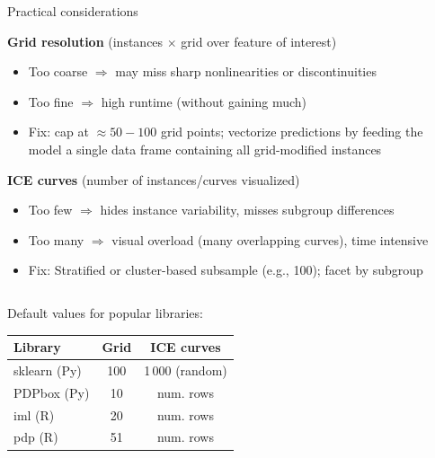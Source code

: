\documentclass[10pt,compress,t,notes=noshow, xcolor=table]{beamer}
\begin{document}
\begin{frame}{Practical considerations}

  \textbf{Grid resolution} (instances $\times$ grid over feature of interest)
        \begin{itemize}
            \item Too coarse $\Rightarrow$ may miss sharp nonlinearities or discontinuities
            \item Too fine $\Rightarrow$ high runtime (without gaining much)
            \item Fix: cap at $\approx 50 - 100$ grid points; vectorize predictions by feeding the model a single data frame containing all grid-modified instances
        \end{itemize}
  \textbf{ICE curves} (number of instances/curves visualized)
        \begin{itemize}
            \item Too few $\Rightarrow$ hides instance variability, misses subgroup differences
            \item Too many $\Rightarrow$ visual overload (many overlapping curves), time intensive%
            \item Fix: Stratified or cluster-based subsample (e.g., 100); facet by subgroup
        \end{itemize}

\begin{columns}[T, onlytextwidth]
\begin{column}{0.5\textwidth}
\small

Default values for popular libraries: 

\medskip

\begin{tabular}{lcc}
\textbf{Library} & \textbf{Grid} & \textbf{ICE curves}\\\hline
sklearn (Py) & 100 & 1\,000 (random) \\
PDPbox  (Py) & 10  & num. rows\\
iml (R)      & 20  & num. rows\\
pdp (R)      & 51  & num. rows\\
\end{tabular}


\end{column}
\end{columns}
\end{frame}
\end{document}
